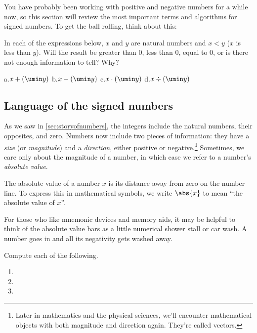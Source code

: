 You have probably been working with positive and negative numbers for a while now, so this section will review the most important terms and algorithms for signed numbers. To get the ball rolling, think about this:

\begin{boxedexplore}
In each of the expressions below, $x$ and $y$ are natural numbers and $x<y$ ($x$ is less than $y$). Will the result be greater than 0, less than 0, equal to 0, or is there not enough information to tell? Why?

a.\quad $x+(\umin y)$
\hfill
b.\quad $x-(\umin y)$
\hfill
c.\quad $x \cdot (\umin y)$
\hfill
d.\quad $x \div (\umin y)$
\hfill
\end{boxedexplore}

\subsection{Language of the signed numbers}

As we saw in \cref{sec:storyofnumbers}, the integers include the natural numbers, their opposites, and zero. Numbers now include two pieces of information: they have a \textit{size} (or \textit{magnitude}) and a \textit{direction}, either positive or negative.\footnote{Later in mathematics and the physical sciences, we'll encounter mathematical objects with both magnitude and direction again. They're called vectors.} Sometimes, we care only about the magnitude of a number, in which case we refer to a number's \textit{absolute value}.

\begin{boxeddef}
The \gls{absolute value} of a number $x$ is its distance away from zero on the number line. To express this in mathematical symbols, we write $\abs{x}$ to mean ``the absolute value of $x$''.
\end{boxeddef}

For those who like mnemonic devices and memory aids, it may be helpful to think of the absolute value bars as a little numerical shower stall or car wash. A number goes in and all its negativity gets washed away.

\begin{boxedex}
Compute each of the following.

\begin{enumerate}[itemsep=10pt]
\item {}

\item {}

\item {}
\end{enumerate}
\end{boxedex}

